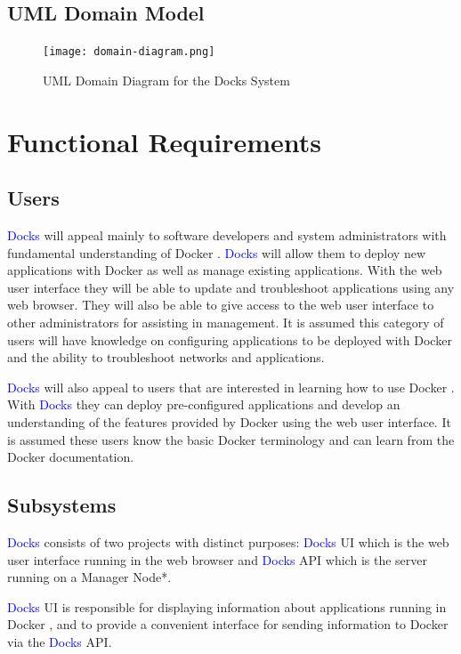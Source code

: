 \documentclass[]{article}
\newcommand{\docks}{\textcolor{Blue}{Docks} }
\newcommand{\docker}{Docker }
\begin{document}
\subsection{UML Domain Model}

\begin{figure}[H]
	\centering
	\texttt{[image: domain-diagram.png]}
	\caption{UML Domain Diagram for the Docks System}
\end{figure}

\section{Functional Requirements}

\subsection{Users}
\docks will appeal mainly to software developers and system administrators
with fundamental understanding of \docker. \docks will allow
them to deploy new applications with \docker as well as manage existing 
applications. With the web user interface they will be able to
update and troubleshoot applications using any web browser. They will
also be able to give access to the web user interface to other administrators
for assisting in management. It is assumed this category of users will
have knowledge on configuring applications to be deployed with \docker
and the ability to troubleshoot networks and applications.

\docks will also appeal to users that are interested in learning how
to use \docker. With \docks they can deploy pre-configured applications and
develop an understanding of the features provided by \docker using the 
web user interface. It is assumed these users know the basic \docker
terminology and can learn from the \docker documentation.

\subsection{Subsystems}

\docks consists of two projects with distinct purposes:
\docks UI which is the web user interface running in the web browser
and \docks API which is the server running on a Manager Node*.

\docks UI is responsible for displaying information about applications running
in \docker, and to provide a convenient interface for sending information
to \docker via the \docks API.
\end{document}
